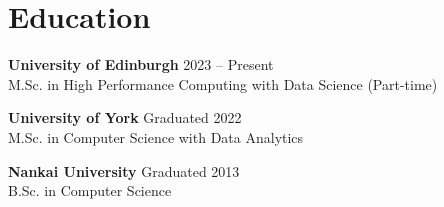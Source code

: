 \documentclass[10pt,a4paper]{article}
\begin{document}
\section{Education}

\textbf{University of Edinburgh} \hfill 2023 -- Present \\
M.Sc. in High Performance Computing with Data Science (Part-time)

\vspace{4pt}
\textbf{University of York} \hfill Graduated 2022 \\
M.Sc. in Computer Science with Data Analytics

\vspace{4pt}
\textbf{Nankai University} \hfill Graduated 2013 \\
B.Sc. in Computer Science
\end{document}
